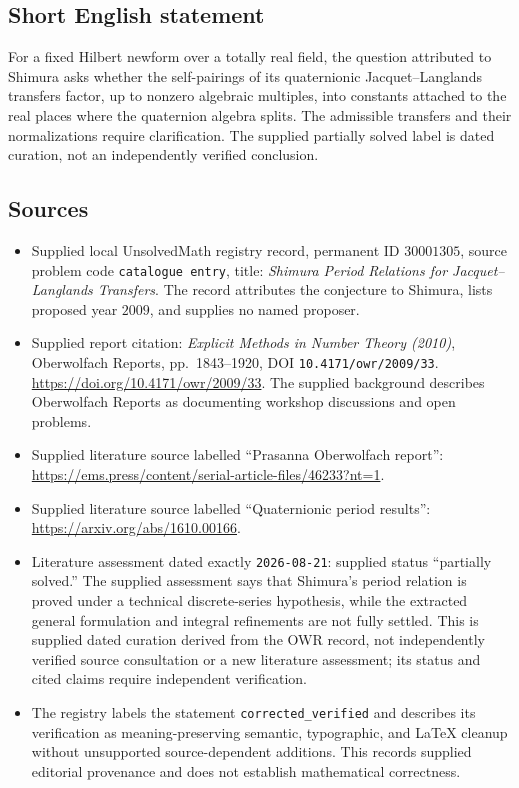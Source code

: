 \documentclass[11pt]{article}
\begin{document}
\subsection{Short English statement}
For a fixed Hilbert newform over a totally real field, the question attributed to Shimura asks whether the self-pairings of its quaternionic Jacquet--Langlands transfers factor, up to nonzero algebraic multiples, into constants attached to the real places where the quaternion algebra splits. The admissible transfers and their normalizations require clarification. The supplied partially solved label is dated curation, not an independently verified conclusion.
\subsection{Sources}
\begin{itemize}
\item Supplied local UnsolvedMath registry record, permanent ID \(30001305\), source problem code \texttt{catalogue entry}, title: \emph{Shimura Period Relations for Jacquet--Langlands Transfers}. The record attributes the conjecture to Shimura, lists proposed year \(2009\), and supplies no named proposer.
\item Supplied report citation: \emph{Explicit Methods in Number Theory (2010)}, Oberwolfach Reports, pp.~1843--1920, DOI \texttt{10.4171/owr/2009/33}. \url{https://doi.org/10.4171/owr/2009/33}. The supplied background describes Oberwolfach Reports as documenting workshop discussions and open problems.
\item Supplied literature source labelled ``Prasanna Oberwolfach report'': \url{https://ems.press/content/serial-article-files/46233?nt=1}.
\item Supplied literature source labelled ``Quaternionic period results'': \url{https://arxiv.org/abs/1610.00166}.
\item Literature assessment dated exactly \texttt{2026-08-21}: supplied status ``partially solved.'' The supplied assessment says that Shimura's period relation is proved under a technical discrete-series hypothesis, while the extracted general formulation and integral refinements are not fully settled. This is supplied dated curation derived from the OWR record, not independently verified source consultation or a new literature assessment; its status and cited claims require independent verification.
\item The registry labels the statement \texttt{corrected\_verified} and describes its verification as meaning-preserving semantic, typographic, and LaTeX cleanup without unsupported source-dependent additions. This records supplied editorial provenance and does not establish mathematical correctness.
\end{itemize}
\end{document}
